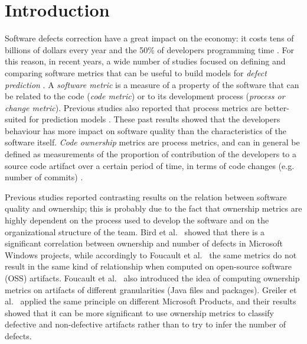 \section{Introduction}
\label{sec:introduction}
Software defects correction have a great impact on the economy: it costs tens of billions of dollars every year and the 50\% of developers programming time \cite{DefectsCost, DefectsCost2}. For this reason, in recent years, a wide number of studies focused on defining and comparing software metrics that can be useful to build models for \textit{defect prediction} \cite{bird:original, Rahman:blame, Greiler:replication, Rahman:2013, moser2008comparative, zimmermann2009cross-project}. A \textit{software metric} is a measure of a property of the software that can be related to the code (\textit{code metric}) or to its development process (\textit{process or change metric}). Previous studies also reported that process metrics are better-suited for prediction models \cite{moser2008comparative, Rahman:2013}. These past results showed that the developers behaviour has more impact on software quality than the characteristics of the software itself. \textit{Code ownership} metrics are process metrics, and can in general be defined as measurements of the proportion of contribution of the developers to a source code artifact over a certain period of time, in terms of code changes (e.g. number of commits) \cite{Greiler:replication}.

Previous studies reported contrasting results on the relation between software quality and ownership; this is probably due to the fact that ownership metrics are highly dependent on the process used to develop the software and on the organizational structure of the team. Bird et al.~\cite{bird:original} showed that there is a significant correlation between ownership and number of defects in Microsoft Windows projects, while accordingly to Foucault et al.~\cite{Foucault:oss} the same metrics do not result in the same kind of relationship when computed on open-source software (OSS) artifacts. Foucault et al.~\cite{Foucault:oss} also introduced the idea of computing ownership metrics on artifacts of different granularities (Java files and packages). Greiler et al.~\cite{Greiler:replication} applied the same principle on different Microsoft Products, and their results showed that it can be more significant to use ownership metrics to classify defective and non-defective artifacts rather than to try to infer the number of defects. 


